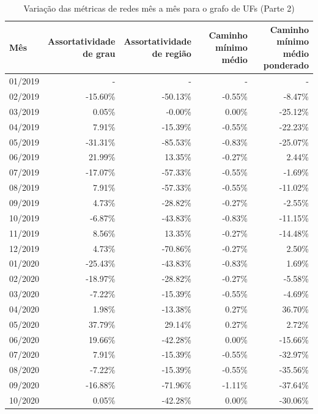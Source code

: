 \begin{table}[htb]
\centering
\caption{Variação das métricas de redes mês a mês para o grafo de UFs (Parte 2)}
\label{tab:metricas-redes-pandemia:grafo-mensal-por-uf2}
\begin{tabular}{l|rrrr}
\toprule
Mês & \shortstack{Assortatividade\\de grau} & \shortstack{Assortatividade\\de região} & \shortstack{Caminho mínimo\\médio} & \shortstack{Caminho mínimo\\médio ponderado} \\
\midrule
01/2019 & - & - & - & - \\
02/2019 & -15.60\% & -50.13\% & -0.55\% &  -8.47\% \\
03/2019 &   0.05\% &  -0.00\% &  0.00\% & -25.12\% \\
04/2019 &   7.91\% & -15.39\% & -0.55\% & -22.23\% \\
05/2019 & -31.31\% & -85.53\% & -0.83\% & -25.07\% \\
06/2019 &  21.99\% &  13.35\% & -0.27\% &   2.44\% \\
07/2019 & -17.07\% & -57.33\% & -0.55\% &  -1.69\% \\
08/2019 &   7.91\% & -57.33\% & -0.55\% & -11.02\% \\
09/2019 &   4.73\% & -28.82\% & -0.27\% &  -2.55\% \\
10/2019 &  -6.87\% & -43.83\% & -0.83\% & -11.15\% \\
11/2019 &   8.56\% &  13.35\% & -0.27\% & -14.48\% \\
12/2019 &   4.73\% & -70.86\% & -0.27\% &   2.50\% \\
01/2020 & -25.43\% & -43.83\% & -0.83\% &   1.69\% \\
02/2020 & -18.97\% & -28.82\% & -0.27\% &  -5.58\% \\
03/2020 &  -7.22\% & -15.39\% & -0.55\% &  -4.69\% \\
04/2020 &   1.98\% & -13.38\% &  0.27\% &  36.70\% \\
05/2020 &  37.79\% &  29.14\% &  0.27\% &   2.72\% \\
06/2020 &  19.66\% & -42.28\% &  0.00\% & -15.66\% \\
07/2020 &   7.91\% & -15.39\% & -0.55\% & -32.97\% \\
08/2020 &  -7.22\% & -15.39\% & -0.55\% & -35.56\% \\
09/2020 & -16.88\% & -71.96\% & -1.11\% & -37.64\% \\
10/2020 &   0.05\% & -42.28\% &  0.00\% & -30.06\% \\
\bottomrule
\end{tabular}
\fdadospesquisa
\end{table}

